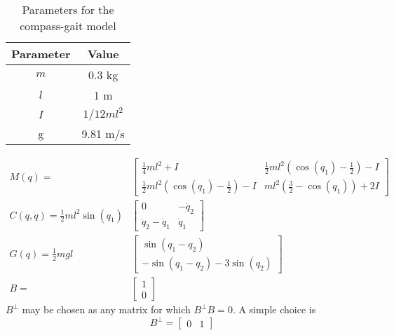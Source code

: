 \begin{table}
	\centering
	\begin{tabular}{c | c}
		Parameter & Value \\ \hline
		$m$ & 0.3 kg \\
		$l$ & 1 m \\
		$I$ & $1/12 ml^2$ \\
		g & 9.81 m/s \\
	\end{tabular}
	\caption{Parameters for the compass-gait model}
	\label{tab:cgparams}
\end{table}

\begin{align*}
	M(q) = &\begin{bmatrix}
		\tfrac{1}{4}ml^2 + I                         & \tfrac{1}{2}ml^2(\cos(q_1)-\tfrac{1}{2}) - I \\
		\tfrac{1}{2}ml^2(\cos(q_1)-\tfrac{1}{2}) - I & ml^2(\tfrac{3}{2}-\cos(q_1)) + 2I
	\end{bmatrix} \\
	C(q,\dot{q}) = \tfrac{1}{2}ml^2\sin(q_1)&\begin{bmatrix}
		0                   & -\dot{q}_2 \\
		\dot{q}_2-\dot{q}_1 & \dot{q}_1
	\end{bmatrix} \\
	G(q) = \tfrac{1}{2}mgl&\begin{bmatrix}
		\sin(q_1 - q_2) \\
		-\sin(q_1 - q_2) - 3\sin(q_2)
	\end{bmatrix} \\
	B = &\begin{bmatrix}
	1 \\ 0
	\end{bmatrix}
\end{align*}
$B^\perp$ may be chosen as any matrix for which $B^\perp B = 0$. A simple choice is 
\[B^\perp = \begin{bmatrix}
	0 & 1
\end{bmatrix}\]

